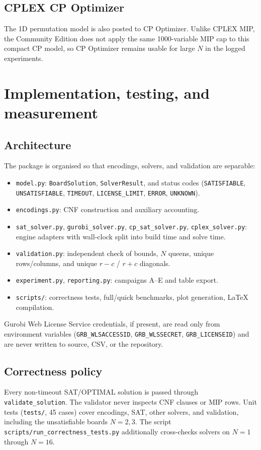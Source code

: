 \documentclass[a4paper,fleqn]{cas-sc}
\begin{document}
\subsection{CPLEX CP Optimizer}
The 1D permutation model is also posted to CP Optimizer.
Unlike CPLEX MIP, the Community Edition does not apply the same 1000-variable MIP cap to this compact CP model, so CP Optimizer remains usable for large $N$ in the logged experiments.

\section{Implementation, testing, and measurement}
\label{sec:impl}

\subsection{Architecture}
The package is organised so that encodings, solvers, and validation are separable:
\begin{itemize}
    \item \texttt{model.py}: \texttt{BoardSolution}, \texttt{SolverResult}, and status codes
    (\texttt{SATISFIABLE}, \texttt{UNSATISFIABLE}, \texttt{TIMEOUT}, \texttt{LICENSE\_LIMIT}, \texttt{ERROR}, \texttt{UNKNOWN}).
    \item \texttt{encodings.py}: CNF construction and auxiliary accounting.
    \item \texttt{sat\_solver.py}, \texttt{gurobi\_solver.py}, \texttt{cp\_sat\_solver.py}, \texttt{cplex\_solver.py}: engine adapters with wall-clock split into build time and solve time.
    \item \texttt{validation.py}: independent check of bounds, $N$ queens, unique rows/columns, and unique $r-c$ / $r+c$ diagonals.
    \item \texttt{experiment.py}, \texttt{reporting.py}: campaigns A--E and table export.
    \item \texttt{scripts/}: correctness tests, full/quick benchmarks, plot generation, LaTeX compilation.
\end{itemize}

Gurobi Web License Service credentials, if present, are read only from environment variables (\texttt{GRB\_WLSACCESSID}, \texttt{GRB\_WLSSECRET}, \texttt{GRB\_LICENSEID}) and are never written to source, CSV, or the repository.

\subsection{Correctness policy}
Every non-timeout SAT/OPTIMAL solution is passed through \texttt{validate\_solution}.
The validator never inspects CNF clauses or MIP rows.
Unit tests (\texttt{tests/}, 45 cases) cover encodings, SAT, other solvers, and validation, including the unsatisfiable boards $N=2,3$.
The script \texttt{scripts/run\_correctness\_tests.py} additionally cross-checks solvers on $N=1$ through $N=16$.
\end{document}
